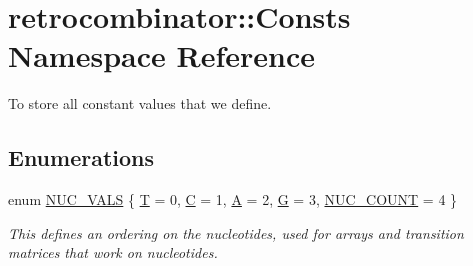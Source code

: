 \hypertarget{namespaceretrocombinator_1_1Consts}{}\section{retrocombinator\+:\+:Consts Namespace Reference}
\label{namespaceretrocombinator_1_1Consts}


To store all constant values that we define.  


\subsection*{Enumerations}
\begin{DoxyCompactItemize}
\item 
enum \hyperlink{namespaceretrocombinator_1_1Consts_a274e9195aeee16a2bc05c6c2d13da17d}{N\+U\+C\+\_\+\+V\+A\+LS} \{ \newline
\hyperlink{namespaceretrocombinator_1_1Consts_a274e9195aeee16a2bc05c6c2d13da17dac9faac145c86659926a2309d19c35dff}{T} = 0, 
\hyperlink{namespaceretrocombinator_1_1Consts_a274e9195aeee16a2bc05c6c2d13da17da8a12357162a7bf22e8578359a62411c6}{C} = 1, 
\hyperlink{namespaceretrocombinator_1_1Consts_a274e9195aeee16a2bc05c6c2d13da17da6c53f477e84902529dcca14ae060567e}{A} = 2, 
\hyperlink{namespaceretrocombinator_1_1Consts_a274e9195aeee16a2bc05c6c2d13da17da06ef41de5b2c3014ce080d3ecece5c4e}{G} = 3, 
\newline
\hyperlink{namespaceretrocombinator_1_1Consts_a274e9195aeee16a2bc05c6c2d13da17da4267c64ef80aa3023d8e808832e04b4e}{N\+U\+C\+\_\+\+C\+O\+U\+NT} = 4
 \}\begin{DoxyCompactList}\small\item\em This defines an ordering on the nucleotides, used for arrays and transition matrices that work on nucleotides. \end{DoxyCompactList}
\end{DoxyCompactItemize}
